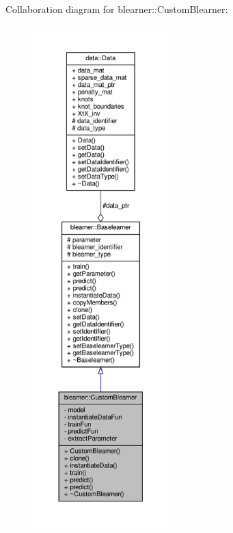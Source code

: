 Collaboration diagram for blearner\+:\+:Custom\+Blearner\+:
\nopagebreak
\begin{figure}[H]
\begin{center}
\leavevmode
\includegraphics[height=550pt]{classblearner_1_1_custom_blearner__coll__graph}
\end{center}
\end{figure}
